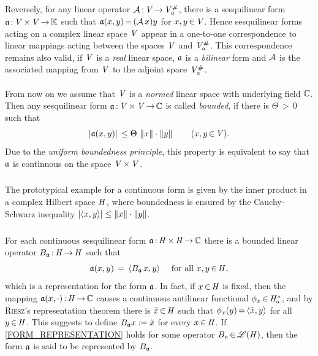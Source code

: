 \documentclass[11pt,twoside]{article}
\begin{document}
\subparagraph{}
Reversely,
for any linear operator $\cal{A} \: \vecV \xto \vecV_a^{\#}$,
there is a sesqui\-linear form $\sql \: \vecV \xtimes \vecV \xto \F$
such that $\sql(x,y) \eq (\cal{A} \, x) y$ for $x,y \xeof \vecV$.
Hence sesquilinear forms acting on a complex linear space $\vecV$
appear in a one-to-one correspondence to linear mappings
acting between the spaces $\vecV$ and $\vecV_a^{\#}$.
This correspondence remains also valid,
if $\vecV$ is a \textit{real} linear space,
$\sql$ is a \textit{bilinear} form
and $\cal{A}$ is the associated mapping
from $\vecV$ to the adjoint space $\vecV_a^{\#}$.

\paragraph{} %
From now on we assume that $\vecV$ is a \textit{normed} linear space
with underlying field $\C$.
Then any sesquilinear form $\sql \: \vecV \xtimes \vecV \xto \C$
is called \textit{bounded},
if there is $\Theta {\,>\,} 0$ such that
\[
\abs{\sql(x,y)} \, \leq \Theta \, \norm{x} \cdot \norm{y}
\quad \quad (x,y \xeof \vecV).
\]
Due to the \textit{uniform boundedness principle},
this property is equivalent to say
that $\sql$ is continuous on the space $\vecV \xtimes \vecV$.

\subparagraph{} %
The prototypical example for a continuous form is given by
the inner product in a complex Hilbert space $\hilH$,
where boundedness is ensured by the Cauchy-Schwarz inequality
$\abs{ \scalar{x}{y} } \leq \norm{x} \cdot \norm{y}$.

\subparagraph{}
For each continuous sesquilinear form $\sql \: \hilH \xtimes \hilH \xto \C$
there is a bounded linear operator $\linB_{\sql} \: \hilH \xto \hilH$
such that
\begin{equation}\label{FORM_REPRESENTATION}
\sql(x,y) \= \scalar{\linB_{\sql} \, x}{y} \qfa x,y \xeof \hilH,
\end{equation}
which is a representation for the form $\sql$.
In fact,
if $x \xeof \hilH$ is fixed,
then the mapping $\sql(x,\cdot) \: \hilH \xto \C$
causes a continuous antilinear functional $\phi_x \xeof \hilH_a^*$,
and by \textsc{Riesz}'s representation theorem
there is $\tilde{x} \xeof \hilH$ such that
$\phi_x(y) \eq \scalar{\tilde{x}}{y}$ for all $y \xeof \hilH$.
This suggests to define $\linB_{\sql} x := \tilde{x}$
for every $x \xeof \hilH$.
If \eqref{FORM_REPRESENTATION} holds for some operator
$\linB_{\sql} \xeof \BO{\hilH}$,
then the form $\sql$ is said to be represented by $\linB_{\sql}$.
\end{document}
